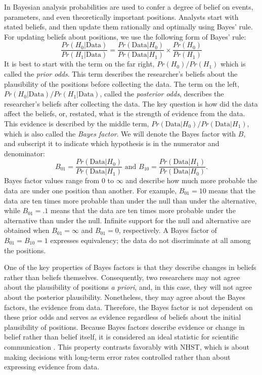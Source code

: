 \documentclass[man]{apa6}
\begin{document}
In Bayesian analysis probabilities are used to confer a degree of belief on events, parameters, and even theoretically important positions.  Analysts start with stated beliefs, and then update them rationally and optimally using Bayes' rule.  For updating beliefs about positions, we use the following form of Bayes' rule:
\begin{equation}
\frac{Pr(H_0 | \mbox{Data})}{Pr(H_1 | \mbox{Data})} = \frac{Pr(\mbox{Data} | H_0)}{Pr(\mbox{Data} | H_1)} \times \frac{Pr(H_0)}{Pr (H_1)} 
\end{equation}
It is best to start with the term on the far right, $Pr(H_0)/Pr(H_1)$ which is called the {\em prior odds}.  This term describes the researcher's beliefs about the plausibility of the positions before collecting the data.  The term on the left, $Pr(H_0 | \mbox{Data})/Pr(H_1 | \mbox{Data})$, called the {\em posterior odds}, describes the researcher's beliefs after collecting the data.   The key question is how did the data affect the beliefs, or, restated, what is the strength of evidence from the data.  This evidence is described by the middle term,  $Pr(\mbox{Data} | H_0)/Pr(\mbox{Data} | H_1)$, which is also called the {\em Bayes factor}.  We will denote the Bayes factor with $B$, and subscript it to indicate which hypothesis is in the numerator and denominator:
\[
B_{01} = \frac{Pr(\mbox{Data} | H_0)}{Pr(\mbox{Data} | H_1)} \mbox{ and } B_{10} = \frac{Pr(\mbox{Data} | H_1)}{Pr(\mbox{Data} | H_0)}.
\]
Bayes factor values range from 0 to $\infty$ and describe how much more probable the data are under one position than another.  For example, $B_{01}=10$ means that the data are ten times more probable than under the null than under the alternative, while $B_{01}=.1$ means that the data are ten times more probable under the alternative than under the null.  Infinite support for the null and alternative are obtained when $B_{01}=\infty$ and $B_{01}=0$, respectively.  A Bayes factor of $B_{01}=B_{10}=1$ expresses equivalency; the data do not discriminate at all among the positions.

One of the key properties of Bayes factors is that they describe changes in beliefs rather than beliefs themselves.  Consequently, two researchers may not agree about the plausibility of positions {\em a priori}, and, in this case, they will not agree about the posterior plausibility.  Nonetheless, they may agree about the Bayes factors, the evidence from data.  Therefore, the Bayes factor is not dependent on these prior odds and serves as evidence regardless of beliefs about the initial plausibility of positions.  Because Bayes factors describe evidence or change in belief rather than belief itself, it is considered an ideal statistic for scientific communication \citep{Jeffreys:1961}.  This property contrasts favorably with NHST, which is about making decisions with long-term error rates controlled rather than about expressing evidence from data. 
\end{document}
